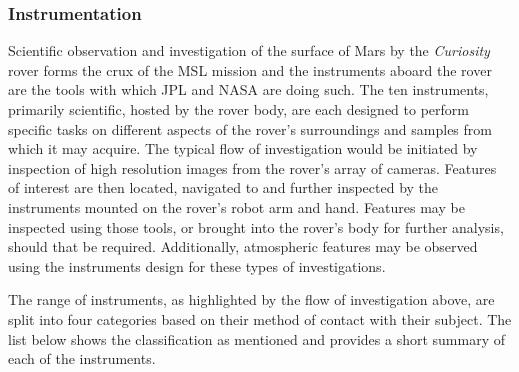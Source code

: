       \subsubsection{Instrumentation}
        Scientific observation and investigation of the surface of Mars by the \textit{Curiosity} rover forms the crux of the MSL mission and the instruments aboard the rover are the tools with which JPL and NASA are doing such. The ten instruments, primarily scientific, hosted by the rover body, are each designed to perform specific tasks on different aspects of the rover's surroundings and samples from which it may acquire. The typical flow of investigation would be initiated by inspection of high resolution images from the rover's array of cameras. Features of interest are then located, navigated to and further inspected by the instruments mounted on the rover's robot arm and hand. Features may be inspected using those tools, or brought into the rover's body for further analysis, should that be required. Additionally, atmospheric features may be observed using the instruments design for these types of investigations.
        
        The range of instruments, as highlighted by the flow of investigation above, are split into four categories based on their method of contact with their subject. The list below shows the classification as mentioned and provides a short summary of each of the instruments.
        
